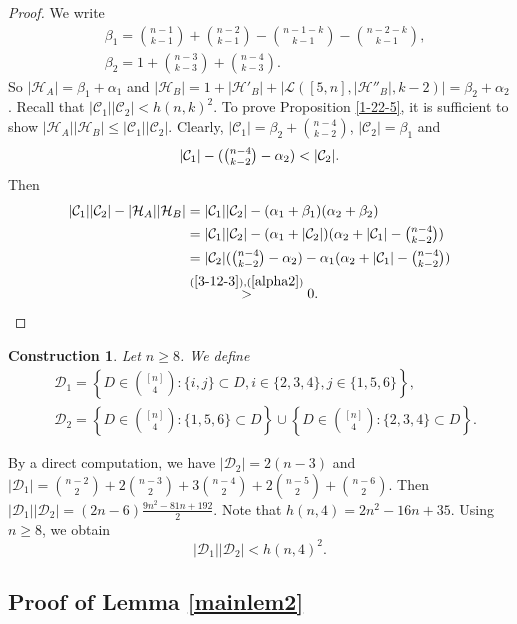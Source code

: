 \documentclass[a4paper,11pt]{article}
\newtheorem{construction}[theorem]{Construction}
\newcommand{\m}{\mathcal}
\begin{document}
\begin{proof}
We write 
\begin{align*}
    &\beta_1={n-1\choose k-1}+{n-2\choose k-1}-{n-1-k\choose k-1}-{n-2-k\choose k-1},\\
    &\beta_2=1+{n-3\choose k-3}+{n-4\choose k-3}.
\end{align*}
So $|\m H_A|=\beta_1+\alpha_1$ and $|\m H_B|=1+|\m H'_B|+|\m L([5,n], |\m H''_B|, k-2)|=\beta_2+\alpha_2$. 
Recall that $|\m C_1||\m C_2|<h(n,k)^2$. To prove Proposition \ref{1-22-5}, it is sufficient to show $|\m H_A||\m H_B|\le |\m C_1||\m C_2|$. 
Clearly, $|\m C_1|=\beta_2+{n-4\choose k-2}$, $|\m C_2|=\beta_1$ and 
\begin{equation}\label{alpha2}
  |\m C_1|-(\tbinom{n-4}{k-2}-\alpha_2)<|\m C_2|.
\end{equation}
 Then
\begin{align*}
|\m C_1||\m C_2|-|\m H_A||\m H_B|
&=|\m C_1||\m C_2|-(\alpha_1+\beta_1)(\alpha_2+\beta_2)\\
&=|\m C_1||\m C_2|-(\alpha_1+|\m C_2|)(\alpha_2+|\m C_1|-\tbinom{n-4}{k-2})\\
&=|\m C_2|(\tbinom{n-4}{k-2}-\alpha_2)-\alpha_1(\alpha_2+|\m C_1|-\tbinom{n-4}{k-2})\\
&\overset{(\ref{3-12-3}),(\ref{alpha2})}{>}0.
\end{align*}
\end{proof}




\begin{construction}\label{2-27-2}
Let $n\ge 8$. We define
    \begin{align*}
    &\m D_1=\left\{D\in {[n]\choose 4}: \{i,j\}\subset D, i\in \{2,3,4\},j\in \{1,5,6\}\right\},\\
    &\m D_2=\left\{D\in {[n]\choose 4}: \{1,5,6\}\subset D\right\} \cup \left\{D\in {[n]\choose 4}: \{2,3,4\}\subset D\right\}.
    \end{align*}
\end{construction}
By a direct computation, we have
$|\m D_2|=2(n-3)$ and 
$|\m D_1|={n-2\choose 2}+2{n-3\choose 2}+3{n-4\choose 2}+2{n-5\choose 2}+{n-6\choose 2}$.
Then
$|\m D_1||\m D_2|=(2n-6)\frac{9n^2-81n+192}{2}$. 
Note that $h(n,4)=2n^2-16n+35$.
Using $n\ge8$, we obtain
\begin{equation}\label{2-27-4}
    |\m D_1||\m D_2|<h(n,4)^2.
\end{equation}




\subsection{Proof of Lemma \ref{mainlem2}}
\end{document}
